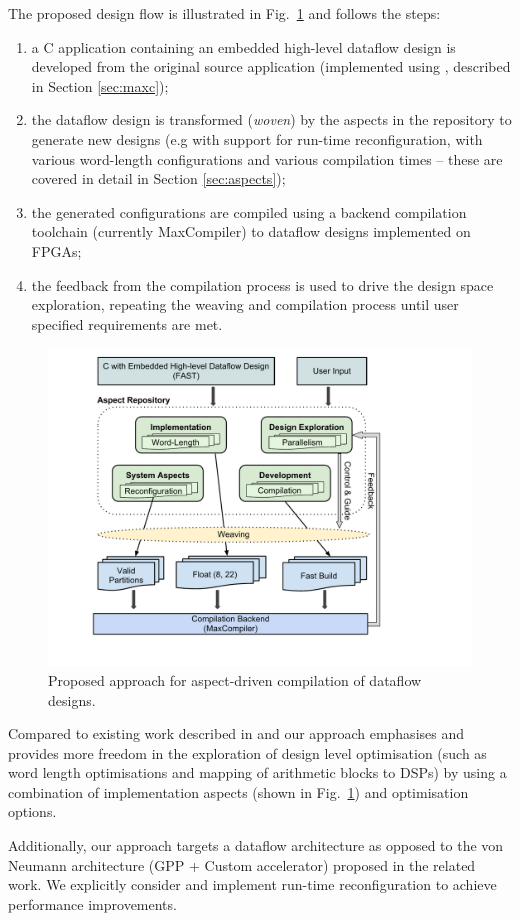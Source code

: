 The proposed design flow is illustrated in Fig.~\ref{fig:design-flow}
and follows the steps:
\begin{enumerate}
\item a C application containing an embedded high-level dataflow
  design is developed from the original source application
  (implemented using \MAXC{}, described in Section \ref{sec:maxc});
\item the dataflow design is transformed (\emph{woven}) by the aspects
  in the repository to generate new designs (e.g with support for
  run-time reconfiguration, with various word-length configurations
  and various compilation times -- these are covered in detail in
  Section \ref{sec:aspects});
\item the generated configurations are compiled using a backend
  compilation toolchain (currently MaxCompiler) to dataflow designs
  implemented on FPGAs;
\item the feedback from the compilation process is used to drive the
  design space exploration, repeating the weaving and compilation
  process until user specified requirements are met.
\end{enumerate}

\begin{figure}[!h]
  \includegraphics[scale=0.5, trim=60 50 0 0]{figs/design-flow}
  \caption{Proposed approach for aspect-driven compilation of dataflow
    designs.}
  \label{fig:design-flow}
\end{figure}

Compared to existing work described in
\cite{Cardoso:Teixeira:Alves:Nobre:Diniz:Cutinho:Luk:2012} and
\cite{cardoso2011new} our approach emphasises and provides more
freedom in the exploration of design level optimisation (such as word
length optimisations and mapping of arithmetic blocks to DSPs) by
using a combination of implementation aspects (shown in
Fig.~\ref{fig:design-flow}) and \MAXC{} optimisation options.

Additionally, our approach targets a dataflow architecture as opposed
to the von Neumann architecture (GPP + Custom accelerator) proposed in
the related work. We explicitly consider and implement run-time
reconfiguration to achieve performance improvements.
